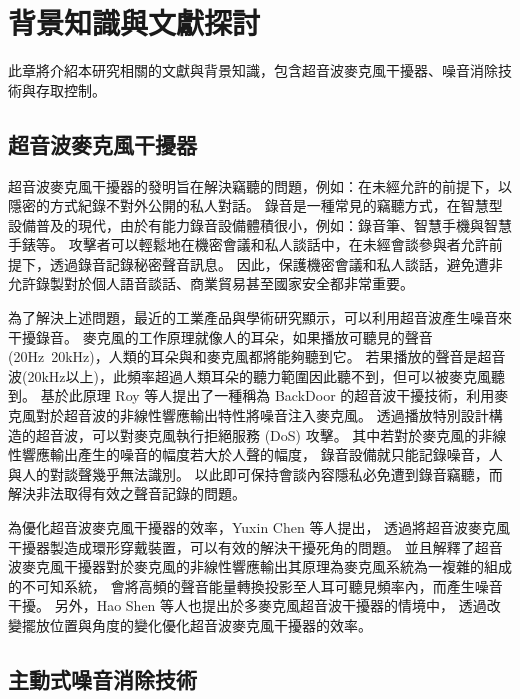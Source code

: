 \chapter{背景知識與文獻探討}\label{chapter:background}

    此章將介紹本研究相關的文獻與背景知識，包含超音波麥克風干擾器、噪音消除技術與存取控制。


\section{超音波麥克風干擾器}\label{section:background-jammer}

    超音波麥克風干擾器的發明旨在解決竊聽的問題，例如：在未經允許的前提下，以隱密的方式紀錄不對外公開的私人對話。
錄音是一種常見的竊聽方式，在智慧型設備普及的現代，由於有能力錄音設備體積很小，例如：錄音筆、智慧手機與智慧手錶等。
攻擊者可以輕鬆地在機密會議和私人談話中，在未經會談參與者允許前提下，透過錄音記錄秘密聲音訊息。
因此，保護機密會議和私人談話，避免遭非允許錄製對於個人語音談話、商業貿易甚至國家安全都非常重要。

    為了解決上述問題，最近的工業產品與學術研究\cite{chen2020wearable}顯示，可以利用超音波產生噪音來干擾錄音。
麥克風的工作原理就像人的耳朵，如果播放可聽見的聲音(20Hz~20kHz)，人類的耳朵與和麥克風都將能夠聽到它。
若果播放的聲音是超音波(20kHz以上)，此頻率超過人類耳朵的聽力範圍因此聽不到，但可以被麥克風聽到。
基於此原理 Roy 等人提出了一種稱為 BackDoor 的超音波干擾技術，利用麥克風對於超音波的非線性響應輸出特性將噪音注入麥克風。
透過播放特別設計構造的超音波，可以對麥克風執行拒絕服務 (DoS) 攻擊\cite{roy2017backdoor}。
其中若對於麥克風的非線性響應輸出產生的噪音的幅度若大於人聲的幅度，
錄音設備就只能記錄噪音，人與人的對談聲幾乎無法識別\cite{shen2019jamsys}。
以此即可保持會談內容隱私必免遭到錄音竊聽，而解決非法取得有效之聲音記錄的問題。

    為優化超音波麥克風干擾器的效率，Yuxin Chen 等人提出，
透過將超音波麥克風干擾器製造成環形穿戴裝置，可以有效的解決干擾死角的問題\cite{chen2020demonstrating}。
並且解釋了超音波麥克風干擾器對於麥克風的非線性響應輸出其原理為麥克風系統為一複雜的組成的不可知系統，
會將高頻的聲音能量轉換投影至人耳可聽見頻率內，而產生噪音干擾\cite{chen2019understanding}。
另外，Hao Shen 等人也提出於多麥克風超音波干擾器的情境中，
透過改變擺放位置與角度的變化優化超音波麥克風干擾器的效率\cite{shen2019jamsys}。


\section{主動式噪音消除技術}\label{section:background-anc}

